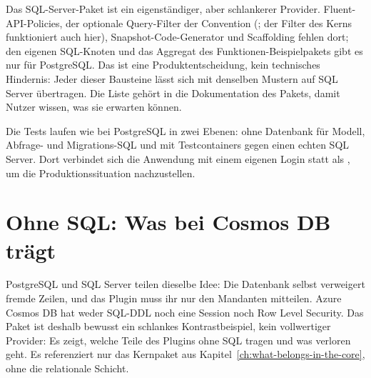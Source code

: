 Das SQL-Server-Paket ist ein eigenständiger, aber schlankerer Provider. Fluent-API-Policies,
der optionale Query-Filter der Convention (; der
Filter des Kerns funktioniert auch hier), Snapshot-Code-Generator und Scaffolding fehlen dort; den
eigenen SQL-Knoten und das Aggregat des Funktionen-Beispielpakets gibt es nur für
PostgreSQL. Das ist eine Produktentscheidung, kein technisches Hindernis: Jeder
dieser Bausteine lässt sich mit denselben Mustern auf SQL Server übertragen. Die Liste gehört
in die Dokumentation des Pakets, damit Nutzer wissen, was sie erwarten können.


Die Tests laufen wie bei PostgreSQL in zwei Ebenen: ohne Datenbank für Modell, Abfrage- und
Migrations-SQL und mit Testcontainers gegen einen echten SQL Server. Dort verbindet sich die
Anwendung mit einem eigenen Login statt als , um die Produktionssituation
nachzustellen.

\chapter{Ohne SQL: Was bei Cosmos DB trägt}\label{ch:without-sql-what-carries-over}

PostgreSQL und SQL Server teilen dieselbe Idee: Die Datenbank selbst verweigert fremde Zeilen,
und das Plugin muss ihr nur den Mandanten mitteilen. Azure Cosmos DB hat weder SQL-DDL noch eine
Session noch Row Level Security. Das Paket
ist deshalb bewusst ein schlankes Kontrastbeispiel, kein vollwertiger Provider: Es zeigt, welche
Teile des Plugins ohne SQL tragen und was verloren geht. Es referenziert nur das Kernpaket aus
Kapitel~\ref{ch:what-belongs-in-the-core}, ohne die relationale Schicht.

